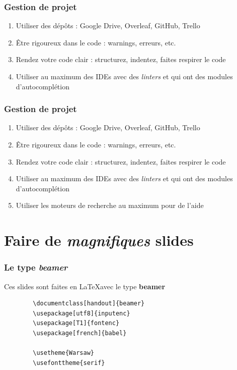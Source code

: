 \documentclass[handout]{beamer}
\begin{document}
	\begin{frame}
		\frametitle{Gestion de projet}
		\begin{enumerate}
			\item Utiliser des dépôts : Google Drive, Overleaf, GitHub, Trello
			\item Être rigoureux dans le code : warnings, erreurs, etc.
			\item Rendez votre code clair : structurez, indentez, faites respirer le code
			\item Utiliser au maximum des IDEs avec des \textit{linters} et qui ont des modules d'autocomplétion
		\end{enumerate}
	\end{frame}

	\begin{frame}
		\frametitle{Gestion de projet}
		\begin{enumerate}
			\item Utiliser des dépôts : Google Drive, Overleaf, GitHub, Trello
			\item Être rigoureux dans le code : warnings, erreurs, etc.
			\item Rendez votre code clair : structurez, indentez, faites respirer le code
			\item Utiliser au maximum des IDEs avec des \textit{linters} et qui ont des modules d'autocomplétion
			\item Utiliser les moteurs de recherche au maximum pour de l'aide
		\end{enumerate}
	\end{frame}

\section{Faire de \textit{magnifiques} slides}


\begin{frame}[fragile=singleslide]
	\frametitle{Le type \textit{beamer}}
	\centering Ces slides sont faites en \LaTeX \hspace{0.1cm}avec le type \textbf{beamer}\\

	\begin{verbatim}
		\documentclass[handout]{beamer}
		\usepackage[utf8]{inputenc}
		\usepackage[T1]{fontenc}
		\usepackage[french]{babel}

		\usetheme{Warsaw}
		\usefonttheme{serif}
	\end{verbatim}
\end{frame}
\end{document}
